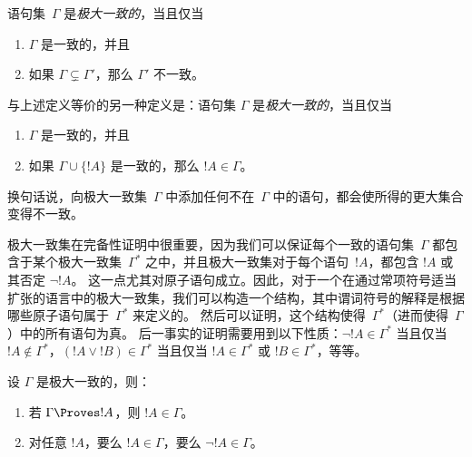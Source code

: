 \documentclass[../../../include/open-logic-section]{subfiles}
\begin{document}

\begin{defn}[极大一致集]
语句集~$\Gamma$ 是\emph{极大一致的}，当且仅当
\begin{enumerate}
\item $\Gamma$ 是一致的，并且
\item 如果 $\Gamma \subsetneq \Gamma'$，那么 $\Gamma'$ 不一致。
\end{enumerate}
\end{defn}

\begin{explain}
与上述定义等价的另一种定义是：语句集 $\Gamma$ 是\emph{极大一致的}，当且仅当
\begin{enumerate}
\item $\Gamma$ 是一致的，并且
\item 如果 $\Gamma \cup \{ !A \}$ 是一致的，那么 $!A \in \Gamma$。
\end{enumerate}
换句话说，向极大一致集~$\Gamma$ 中添加任何不在~$\Gamma$ 中的语句，都会使所得的更大集合变得不一致。
\end{explain}

\begin{explain}
极大一致集在完备性证明中很重要，因为我们可以保证每个一致的语句集~$\Gamma$ 都包含于某个极大一致集~$\Gamma^*$ 之中，并且极大一致集对于每个语句~$!A$，都包含 $!A$ 或其否定 $\lnot !A$。
这一点尤其对原子语句成立。因此，对于一个在通过常项符号适当扩张的语言中的极大一致集，我们可以构造一个结构，其中谓词符号的解释是根据哪些原子语句属于~$\Gamma^*$ 来定义的。
然后可以证明，这个结构使得~$\Gamma^*$（进而使得~$\Gamma$）中的所有语句为真。
后一事实的证明需要用到以下性质：$\lnot !A \in \Gamma^*$ 当且仅当 $!A \notin \Gamma^*$，$(!A \lor !B) \in \Gamma^*$ 当且仅当 $!A \in \Gamma^*$ 或 $!B \in \Gamma^*$，等等。
\end{explain}

\begin{prop}
设 $\Gamma$ 是极大一致的，则：
\begin{enumerate}
\item {} 若 $\Gamma \Proves !A$，则 $!A \in \Gamma$。

\item {} 对任意 $!A$，要么 $!A \in \Gamma$，要么 $\lnot !A \in \Gamma$。



\end{enumerate}
\end{prop}
\end{document}
